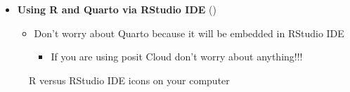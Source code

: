 \documentclass[
  ignorenonframetext,
]{beamer}
\providecommand{\tightlist}{%
  \setlength{\itemsep}{0pt}\setlength{\parskip}{0pt}}\usepackage{longtable,booktabs,array}
\begin{document}
\begin{frame}{}
\label{section-8}
\begin{itemize}
\item
  \textbf{Using R and Quarto via RStudio IDE}
  ()

  \begin{itemize}
  \tightlist
  \item
    Don't worry about Quarto because it will be embedded in RStudio IDE

    \begin{itemize}
    \tightlist
    \item
      If you are using posit Cloud don't worry about anything!!!
    \end{itemize}
  \end{itemize}
\end{itemize}

\begin{figure}

\begin{minipage}{0.50\linewidth}



\end{minipage}%
%
\begin{minipage}{0.50\linewidth}



\end{minipage}%

\caption{\label{fig-r_vs_rstudio_ide_2}R versus RStudio IDE icons on
your computer}

\end{figure}%
\end{frame}
\end{document}
